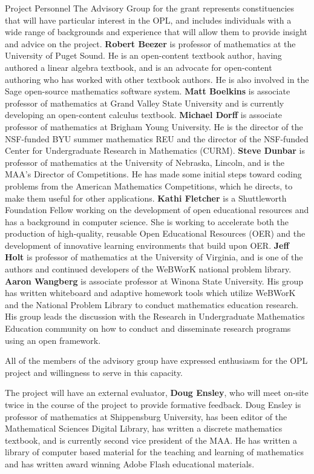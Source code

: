 \documentclass[11pt]{article}
\begin{document}
\begin{section}{Project Personnel}
The Advisory Group for the grant represents constituencies that will have
particular interest in the OPL, and includes individuals with a wide range
of backgrounds and experience that will allow them to provide insight and
advice on the project.  \textbf{Robert Beezer} is professor of mathematics
at the University of Puget Sound.  He is an open-content textbook author,
having authored a linear algebra textbook, and is an advocate for
open-content authoring who has worked with other textbook authors.  He is
also involved in the Sage open-source mathematics software system.
\textbf{Matt Boelkins} is associate professor of mathematics at Grand
Valley State University and is currently developing an open-content
calculus textbook.  \textbf{Michael Dorff} is associate professor of
mathematics at Brigham Young University.  He is the director of the
NSF-funded BYU summer mathematics REU and the director of the NSF-funded
Center for Undergraduate Research in Mathematics (CURM).  \textbf{Steve
Dunbar} is professor of mathematics at the University of Nebraska,
Lincoln, and is the MAA's Director of Competitions.  He has made some
initial steps toward coding problems from the American Mathematics
Competitions, which he directs, to make them useful for other
applications.  \textbf{Kathi Fletcher} is a Shuttleworth Foundation Fellow
working on the development of open educational resources and has a
background in computer science.  She is working to accelerate both the
production of high-quality, reusable Open Educational Resources (OER) and
the development of innovative learning environments that build upon OER.
\textbf{Jeff Holt} is professor of mathematics at the University of
Virginia, and is one of the authors and continued developers of the
WeBWorK national problem library.  \textbf{Aaron Wangberg} is associate
professor at Winona State University.  His group has written whiteboard
and adaptive homework tools which utilize WeBWorK and the National Problem
Library to conduct mathematics education research.  His group leads the
discussion with the Research in Undergraduate Mathematics Education
community on how to conduct and disseminate research programs using an
open framework.

All of the members of the advisory group have expressed enthusiasm for the
OPL project and willingness to serve in this capacity.

The project will have an external evaluator, \textbf{Doug Ensley}, who
will meet on-site twice in the course of the project to provide formative
feedback.  Doug Ensley is professor of mathematics at Shippensburg
University, has been editor of the Mathematical Sciences Digital Library,
has written a discrete mathematics textbook, and is currently second vice
president of the MAA.  He has written a library of computer based material
for the teaching and learning of mathematics and has written award winning
Adobe Flash educational materials.


\end{section}
\end{document}
